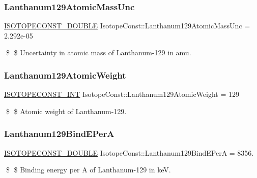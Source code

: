 \subsubsection{\texorpdfstring{Lanthanum129\+Atomic\+Mass\+Unc}{Lanthanum129AtomicMassUnc}}
{\footnotesize\ttfamily \mbox{\hyperlink{group___isotope_const-_macros_ga8f45a7272ce02c0b4c65c44636ed719a}{I\+S\+O\+T\+O\+P\+E\+C\+O\+N\+S\+T\+\_\+\+D\+O\+U\+B\+LE}} Isotope\+Const\+::\+Lanthanum129\+Atomic\+Mass\+Unc = 2.\+292e-\/05}

\$ \$ Uncertainty in atomic mass of Lanthanum-\/129 in amu. \mbox{\label{group___isotope_const-_lanthanum-_la129_ga9494cf82905ae8baf914138acd4f5f41}} 
\subsubsection{\texorpdfstring{Lanthanum129\+Atomic\+Weight}{Lanthanum129AtomicWeight}}
{\footnotesize\ttfamily \mbox{\hyperlink{group___isotope_const-_macros_ga5f18360b3e99483a35c32d789e62621c}{I\+S\+O\+T\+O\+P\+E\+C\+O\+N\+S\+T\+\_\+\+I\+NT}} Isotope\+Const\+::\+Lanthanum129\+Atomic\+Weight = 129}

\$ \$ Atomic weight of Lanthanum-\/129. \mbox{\label{group___isotope_const-_lanthanum-_la129_ga72cbc208d88e004ee32b699f3f3b4f8e}} 
\subsubsection{\texorpdfstring{Lanthanum129\+Bind\+E\+PerA}{Lanthanum129BindEPerA}}
{\footnotesize\ttfamily \mbox{\hyperlink{group___isotope_const-_macros_ga8f45a7272ce02c0b4c65c44636ed719a}{I\+S\+O\+T\+O\+P\+E\+C\+O\+N\+S\+T\+\_\+\+D\+O\+U\+B\+LE}} Isotope\+Const\+::\+Lanthanum129\+Bind\+E\+PerA = 8356.}

\$ \$ Binding energy per A of Lanthanum-\/129 in keV. \mbox{\label{group___isotope_const-_lanthanum-_la129_gaca6861c78f576d6835e656f93bf45461}} 

